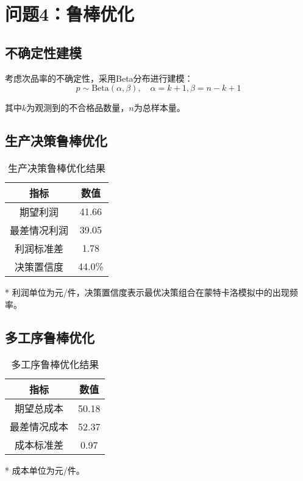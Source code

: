 \documentclass[12pt]{article}
\begin{document}
\section{问题4：鲁棒优化}
\subsection{不确定性建模}

考虑次品率的不确定性，采用Beta分布进行建模：
\begin{equation}
p \sim \text{Beta}(\alpha, \beta), \quad \alpha = k+1, \beta = n-k+1
\end{equation}

其中$k$为观测到的不合格品数量，$n$为总样本量。

\subsection{生产决策鲁棒优化}

\begin{table}[htbp]
\centering
\caption{生产决策鲁棒优化结果}
\begin{threeparttable}
\begin{tabular}{@{}cc@{}}
\toprule
指标 & 数值 \\
\midrule
期望利润 & 41.66 \\
最差情况利润 & 39.05 \\
利润标准差 & 1.78 \\
决策置信度 & 44.0\% \\
\bottomrule
\end{tabular}
\begin{tablenotes}
\item[*] 利润单位为元/件，决策置信度表示最优决策组合在蒙特卡洛模拟中的出现频率。
\end{tablenotes}
\end{threeparttable}
\end{table}

\subsection{多工序鲁棒优化}

\begin{table}[htbp]
\centering
\caption{多工序鲁棒优化结果}
\begin{threeparttable}
\begin{tabular}{@{}cc@{}}
\toprule
指标 & 数值 \\
\midrule
期望总成本 & 50.18 \\
最差情况成本 & 52.37 \\
成本标准差 & 0.97 \\
\bottomrule
\end{tabular}
\begin{tablenotes}
\item[*] 成本单位为元/件。
\end{tablenotes}
\end{threeparttable}
\end{table}
\end{document}
